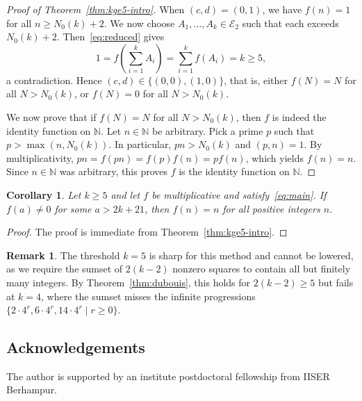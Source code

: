 \documentclass[11pt,a4paper]{amsart}
\newcommand{\N}{\mathbb{N}}
\newcommand{\E}{\mathcal{E}}
\theoremstyle{plain}
\newtheorem{corollary}[theorem]{Corollary}
\theoremstyle{definition}
\newtheorem{remark}[theorem]{Remark}
\begin{document}
\begin{proof}[Proof of Theorem~\ref{thm:kge5-intro}]
When $(c,d) = (0,1)$, we have $f(n) = 1$ for all $n \ge N_0(k)+2$. We now choose $A_1, \dots, A_k \in \E_2$ such that each exceeds $N_0(k)+2$. Then~\eqref{eq:reduced} gives \[1=f(\sum_{i=1}^{k}A_i)=\sum_{i=1}^{k} f(A_i) = k \ge 5,\] a contradiction. Hence $(c,d) \in \{(0,0),(1,0)\}$, that is, either $f(N) = N$ for all $N > N_0(k)$, or $f(N) = 0$ for all $N > N_0(k)$.

We now prove that if $f(N) = N$ for all $N > N_0(k)$, then $f$ is indeed the identity function on $\N$. Let $n\in \N$ be arbitrary. Pick a prime $p$ such that $p>\max (n,N_{0}(k))$. In particular, $pn>N_{0}(k)$ and $(p,n)=1$. By multiplicativity, $pn=f(pn)=f(p)f(n)=pf(n)$, which yields $f(n)=n$. Since $n\in \N$ was arbitrary, this proves $f$ is the identity function on $\N$.
\end{proof}

\begin{corollary}\label{cor:kge5-id}
Let $k \ge 5$ and let $f$ be multiplicative and satisfy~\eqref{eq:main}. If $f(a) \neq 0$ for some $a>2k+21$, then $f(n) = n$ for all positive integers $n$.
\end{corollary}
\begin{proof}
    The proof is immediate from Theorem~\ref{thm:kge5-intro}.
\end{proof}
\begin{remark}
The threshold $k = 5$ is sharp for this method and cannot be lowered, as we require the sumset of $2(k-2)$ nonzero squares to contain all but finitely many integers. By Theorem~\ref{thm:dubouis}, this holds for $2(k-2) \ge 5$ but fails at $k = 4$, where the sumset misses the infinite progressions $\{2 \cdot 4^r, 6 \cdot 4^r, 14 \cdot 4^r \mid r \ge 0\}$.
\end{remark}
\subsection*{Acknowledgements}
The author is supported by an institute postdoctoral fellowship from IISER Berhampur.


\end{document}
